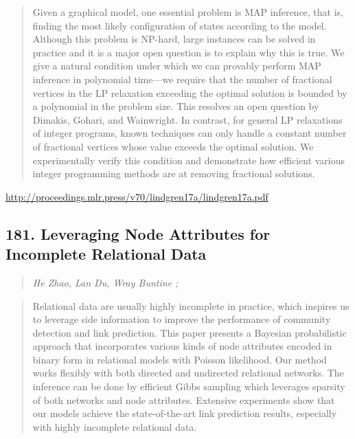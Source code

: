 \documentclass{article}
\begin{document}
\begin{quote}
    Given a graphical model, one essential problem is MAP inference, that is, finding the most likely configuration of states according to the model. Although this problem is NP-hard, large instances can be solved in practice and it is a major open question is to explain why this is true. We give a natural condition under which we can provably perform MAP inference in polynomial time—we require that the number of fractional vertices in the LP relaxation exceeding the optimal solution is bounded by a polynomial in the problem size. This resolves an open question by Dimakis, Gohari, and Wainwright. In contrast, for general LP relaxations of integer programs, known techniques can only handle a constant number of fractional vertices whose value exceeds the optimal solution. We experimentally verify this condition and demonstrate how efficient various integer programming methods are at removing fractional solutions.  
\end{quote}

\href{http://proceedings.mlr.press/v70/lindgren17a/lindgren17a.pdf}{http://proceedings.mlr.press/v70/lindgren17a/lindgren17a.pdf}

\subsection{181. Leveraging Node Attributes for Incomplete Relational Data}

\begin{quote}
\footnotesize{\textit{He Zhao, Lan Du, Wray Buntine ;}}

\end{quote}

\begin{quote}
    Relational data are usually highly incomplete in practice, which inspires us to leverage side information to improve the performance of community detection and link prediction. This paper presents a Bayesian probabilistic approach that incorporates various kinds of node attributes encoded in binary form in relational models with Poisson likelihood. Our method works flexibly with both directed and undirected relational networks. The inference can be done by efficient Gibbs sampling which leverages sparsity of both networks and node attributes. Extensive experiments show that our models achieve the state-of-the-art link prediction results, especially with highly incomplete relational data.  
\end{quote}
\end{document}
